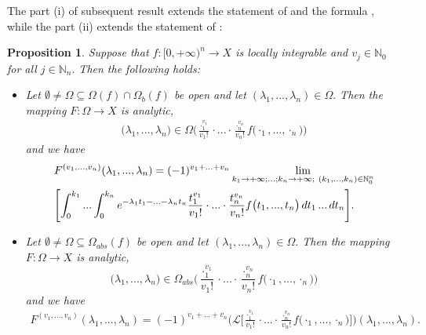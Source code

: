 \documentclass{amsart}
\newtheorem{prop}[thm]{Proposition}
\theoremstyle{definition}
\theoremstyle{remark}
\numberwithin{equation}{section}
\begin{document}
The part (i) of subsequent result extends the statement of \cite[Theorem 1.5.1]{a43} and the formula \cite[(34), p. 58]{FKP}, while the part (ii) extends the statement of \cite[Proposition 8.2.1(i)]{funkcionalne}:

\begin{prop}\label{analyticala}
Suppose that $f: [0,+\infty)^{n}\rightarrow X$ is locally integrable and $v_{j}\in {\mathbb N}_{0}$ for all $j\in {\mathbb N}_{n}.$ Then the following holds:
\begin{itemize}
\item[(i)] Let $\emptyset \neq \Omega \subseteq \Omega(f) \cap \Omega_{b}(f)$ be open and let $(\lambda_{1},...,\lambda_{n})\in \Omega.$ Then the mapping $F: \Omega \rightarrow X$ is analytic,
\begin{align}\label{kec}
\bigl(\lambda_{1},...,\lambda_{n}\bigr)\in \Omega \Biggl(\frac{\cdot_{1}^{v_{1}}}{v_{1}!}\cdot ...\cdot\frac{\cdot_{n}^{v_{n}}}{v_{n}!}f\bigl( \cdot_{1},...,\cdot_{n}\bigr)\Biggr)
\end{align} 
and we have
\begin{align}\notag &
F^{(v_{1},...,v_{n})}(\lambda_{1},...,\lambda_{n})=(-1)^{v_{1}+...+v_{n}} \lim_{k_{1}\rightarrow +\infty;...;k_{n}\rightarrow +\infty; \ (k_{1},...,k_{n})\in {\mathbb N}_{0}^{n}}\\\label{izvodi}& \Biggl[ \int^{k_{1}}_{0}...\int^{k_{n}}_{0}e^{-\lambda_{1}t_{1}-...-\lambda_{n}t_{n}}\frac{t_{1}^{v_{1}}}{v_{1}!}\cdot ... \cdot\frac{t_{n}^{v_{n}}}{v_{n}!} f\bigl(t_{1},...,t_{n}\bigr)\, dt_{1}\, ...\, dt_{n} \Biggr].
\end{align}
\item[(ii)] Let $\emptyset \neq \Omega \subseteq \Omega_{abs}(f)$ be open and let $(\lambda_{1},...,\lambda_{n})\in \Omega.$ Then the mapping $F: \Omega \rightarrow X$ is analytic, $$\bigl(\lambda_{1},...,\lambda_{n}\bigr)\in \Omega_{abs}\Biggl(\frac{\cdot_{1}^{v_{1}}}{v_{1}!}\cdot ...\cdot\frac{\cdot_{n}^{v_{n}}}{v_{n}!}f\bigl( \cdot_{1},...,\cdot_{n}\bigr)\Biggr)$$ and we have
\begin{align*}
F^{(v_{1},...,v_{n})}(\lambda_{1},...,\lambda_{n})=(-1)^{v_{1}+...+v_{n}}\Biggl({\mathcal L}\Biggl[\frac{\cdot_{1}^{v_{1}}}{v_{1}!}\cdot ...\cdot\frac{\cdot_{n}^{v_{n}}}{v_{n}!}f\bigl( \cdot_{1},...,\cdot_{n}\bigr)\Biggr]\Biggr)(\lambda_{1},...,\lambda_{n}).
\end{align*}
\end{itemize}
\end{prop}
\end{document}
